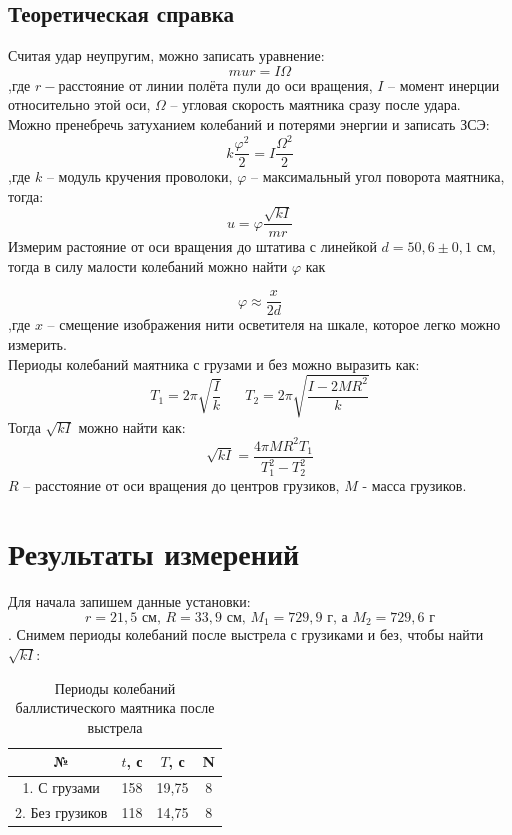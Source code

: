 \documentclass[a4paper,14pt]{extarticle}
\begin{document}
	\subsection{Теоретическая справка}
	Считая удар неупругим, можно записать уравнение:
	$$mur=I \Omega$$
	,где $r-$расстояние от линии полёта пули до оси вращения, $I$ -- момент инерции относительно этой оси, $\Omega$ -- угловая скорость маятника сразу после удара.
	\\Можно пренебречь затуханием колебаний и потерями энергии и записать ЗСЭ:
	$$ k \frac{\varphi^2}{2} = I \frac{\Omega^2}{2} $$
	\noindent ,где $k$ -- модуль кручения проволоки, $\varphi$ -- максимальный угол поворота маятника, тогда:
	\begin{equation} \label{vel2}
		u = \varphi \frac{\sqrt{kI}}{mr} 
	\end{equation}
	Измерим растояние от оси вращения до штатива с линейкой $d = 50,6 \pm 0,1 \text{ см}$, тогда в силу малости колебаний можно найти $\varphi$ как
	
	\begin{equation}
		\label{phi}
		\varphi \approx \frac{x}{2d}
	\end{equation}
	,где $x$ -- смещение изображения нити осветителя на шкале, которое легко можно измерить.
	\\Периоды колебаний маятника с грузами и без можно выразить как:
	$$T_1= 2 \pi \sqrt{\frac{I}{k}} \;\;\;\;\;\; T_2 = 2 \pi \sqrt{\frac{I - 2MR^2}{k}}$$
	Тогда $\sqrt{kI}$ можно найти как:
	\begin{equation}
		\sqrt{kI} = \frac{4 \pi M R^2 T_1}{T_1^2 - T_2^2}
		\label{kl}
	\end{equation}
	$R$ -- расстояние от оси вращения до центров грузиков, $M$ - масса грузиков.
	\section{Результаты измерений}
	Для начала запишем данные установки: $$ r = 21,5 \text{ см} \text{, } R = 33,9 \text{ см} \text{, } M_1 = 729,9\text{ г} \text{, а } M_2 = 729,6 \text{ г} $$.
	Снимем периоды колебаний после выстрела с грузиками и без, чтобы найти $\sqrt{kI}$:
	
	\begin{table}[H]
		\begin{center}
			\begin{tabular}{|c|c|c|c|}
				\hline
				№  & $t$, с  & $T$, с&  N \\
				\hline
				1. С грузами & 158 & 19,75 & 8\\
				\hline
				2. Без грузиков & 118 & 14,75& 8\\
				\hline 
			\end{tabular}
			\caption{Периоды колебаний баллистического маятника после выстрела}
		\end{center}
	\end{table}
	
\end{document}

